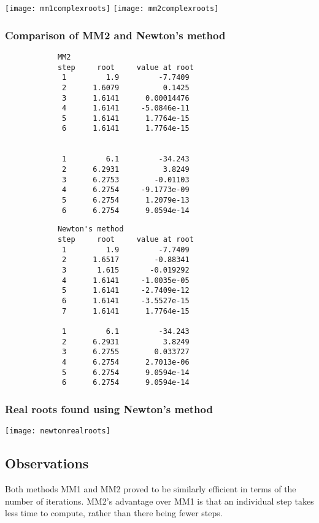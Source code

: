 \documentclass{article}
\begin{document}
	\texttt{[image: mm1complexroots]}
	\texttt{[image: mm2complexroots]}
	
	\newpage
	\subsubsection{Comparison of MM2 and Newton's method}
	
		\begin{multicols}{2}
		\begin{verbatim}
			MM2
			step     root     value at root
			 1         1.9         -7.7409 
			 2      1.6079          0.1425 
			 3      1.6141      0.00014476 
			 4      1.6141     -5.0846e-11 
			 5      1.6141      1.7764e-15 
			 6      1.6141      1.7764e-15 
			 

			 1         6.1         -34.243 
			 2      6.2931          3.8249 
			 3      6.2753        -0.01103 
			 4      6.2754     -9.1773e-09 
			 5      6.2754      1.2079e-13 
			 6      6.2754      9.0594e-14 
		\end{verbatim}
		\begin{verbatim}
			Newton's method
			step     root     value at root
			 1         1.9         -7.7409 
			 2      1.6517        -0.88341 
			 3       1.615       -0.019292 
			 4      1.6141     -1.0035e-05 
			 5      1.6141     -2.7409e-12 
			 6      1.6141     -3.5527e-15 
			 7      1.6141      1.7764e-15 
			 
			 1         6.1         -34.243  
			 2      6.2931          3.8249  
			 3      6.2755        0.033727  
			 4      6.2754      2.7013e-06  
			 5      6.2754      9.0594e-14  
			 6      6.2754      9.0594e-14  
		\end{verbatim}
	\end{multicols}
	
	\subsubsection{Real roots found using Newton's method}
	
	\texttt{[image: newtonrealroots]}
	
	\subsection{Observations}
	
	Both methods MM1 and MM2 proved to be similarly efficient in terms of the
	number of iterations. MM2's advantage over MM1 is that an individual step
	takes less time to compute, rather than there being fewer steps.
	
\end{document}
